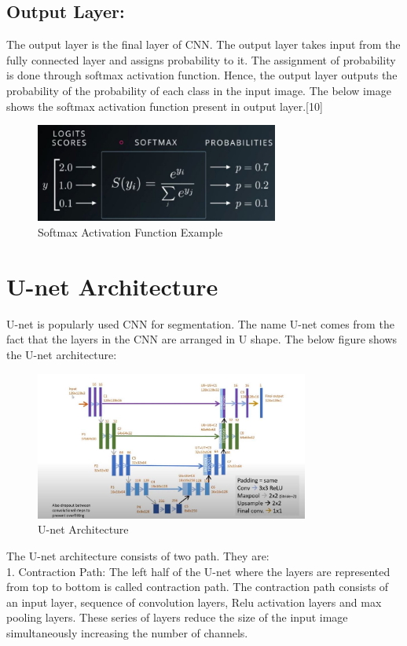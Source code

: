 \documentclass{IEEEtran}
\begin{document}
\subsection{\textbf{Output Layer:}}
The output layer is the final layer of CNN. The output layer takes input from the fully connected layer and assigns probability to it. The assignment of probability is done through softmax activation function. Hence, the output layer outputs the probability of the probability of each class in the input image. The below image shows the softmax activation function present in output layer.[10]

\begin{figure}[h]
    \centering
    \captionsetup{justification=centering}
    \includegraphics[width=8cm]{softmax}
    \caption{Softmax Activation Function Example}
    \label{fig:Softmax Activation Function Example}
\end{figure}
\newpage
\section{\textbf{U-net Architecture}}
U-net is popularly used CNN for segmentation. The name U-net comes from the fact that the layers in the CNN are arranged in U shape. The below figure shows the U-net architecture:

\begin{figure}[h]
    \centering
    \captionsetup{justification=centering}
    \includegraphics[width=9cm]{u-net}
    \caption{U-net Architecture}
    \label{fig:U-net Architecture}
\end{figure}

The U-net architecture consists of two path. They are:\\
1. Contraction Path: The left half of the U-net where the layers are represented from top to bottom is called contraction path. The contraction path consists of an input layer, sequence of convolution layers, Relu activation layers and max pooling layers. These series of layers reduce the size of the input image simultaneously increasing the number of channels.
\end{document}
